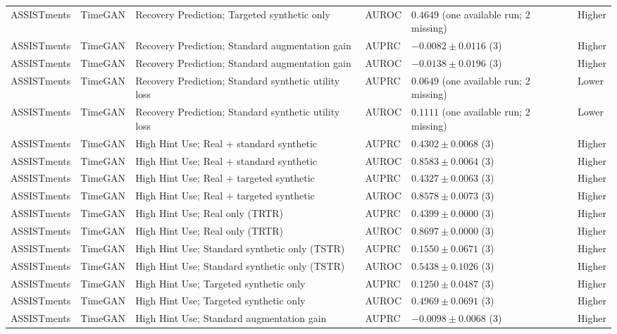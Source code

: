 \begin{longtable}{@{}p{2.25cm}p{2.05cm}p{4.7cm}p{5.0cm}p{2.6cm}p{1.25cm}@{}}
ASSISTments & TimeGAN & Recovery Prediction; Targeted synthetic only & AUROC & $0.4649$ (one available run; 2 missing) & Higher \\
ASSISTments & TimeGAN & Recovery Prediction; Standard augmentation gain & AUPRC & $-0.0082 \mathbin{\pm} 0.0116$ (3) & Higher \\
ASSISTments & TimeGAN & Recovery Prediction; Standard augmentation gain & AUROC & $-0.0138 \mathbin{\pm} 0.0196$ (3) & Higher \\
ASSISTments & TimeGAN & Recovery Prediction; Standard synthetic utility loss & AUPRC & $0.0649$ (one available run; 2 missing) & Lower \\
ASSISTments & TimeGAN & Recovery Prediction; Standard synthetic utility loss & AUROC & $0.1111$ (one available run; 2 missing) & Lower \\
ASSISTments & TimeGAN & High Hint Use; Real + standard synthetic & AUPRC & $0.4302 \mathbin{\pm} 0.0068$ (3) & Higher \\
ASSISTments & TimeGAN & High Hint Use; Real + standard synthetic & AUROC & $0.8583 \mathbin{\pm} 0.0064$ (3) & Higher \\
ASSISTments & TimeGAN & High Hint Use; Real + targeted synthetic & AUPRC & $0.4327 \mathbin{\pm} 0.0063$ (3) & Higher \\
ASSISTments & TimeGAN & High Hint Use; Real + targeted synthetic & AUROC & $0.8578 \mathbin{\pm} 0.0073$ (3) & Higher \\
ASSISTments & TimeGAN & High Hint Use; Real only (TRTR) & AUPRC & $0.4399 \mathbin{\pm} 0.0000$ (3) & Higher \\
ASSISTments & TimeGAN & High Hint Use; Real only (TRTR) & AUROC & $0.8697 \mathbin{\pm} 0.0000$ (3) & Higher \\
ASSISTments & TimeGAN & High Hint Use; Standard synthetic only (TSTR) & AUPRC & $0.1550 \mathbin{\pm} 0.0671$ (3) & Higher \\
ASSISTments & TimeGAN & High Hint Use; Standard synthetic only (TSTR) & AUROC & $0.5438 \mathbin{\pm} 0.1026$ (3) & Higher \\
ASSISTments & TimeGAN & High Hint Use; Targeted synthetic only & AUPRC & $0.1250 \mathbin{\pm} 0.0487$ (3) & Higher \\
ASSISTments & TimeGAN & High Hint Use; Targeted synthetic only & AUROC & $0.4969 \mathbin{\pm} 0.0691$ (3) & Higher \\
ASSISTments & TimeGAN & High Hint Use; Standard augmentation gain & AUPRC & $-0.0098 \mathbin{\pm} 0.0068$ (3) & Higher \\

\end{longtable}
